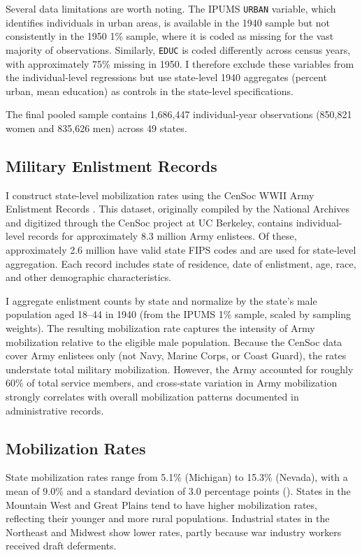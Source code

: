 \documentclass[12pt]{article}
\begin{document}
Several data limitations are worth noting. The IPUMS \texttt{URBAN} variable, which identifies individuals in urban areas, is available in the 1940 sample but not consistently in the 1950 1\% sample, where it is coded as missing for the vast majority of observations. Similarly, \texttt{EDUC} is coded differently across census years, with approximately 75\% missing in 1950. I therefore exclude these variables from the individual-level regressions but use state-level 1940 aggregates (percent urban, mean education) as controls in the state-level specifications.

The final pooled sample contains 1,686,447 individual-year observations (850,821 women and 835,626 men) across 49 states.

\subsection{Military Enlistment Records}

I construct state-level mobilization rates using the CenSoc WWII Army Enlistment Records \citep{cenSoc2024}. This dataset, originally compiled by the National Archives and digitized through the CenSoc project at UC Berkeley, contains individual-level records for approximately 8.3 million Army enlistees. Of these, approximately 2.6 million have valid state FIPS codes and are used for state-level aggregation. Each record includes state of residence, date of enlistment, age, race, and other demographic characteristics.

I aggregate enlistment counts by state and normalize by the state's male population aged 18--44 in 1940 (from the IPUMS 1\% sample, scaled by sampling weights). The resulting mobilization rate captures the intensity of Army mobilization relative to the eligible male population. Because the CenSoc data cover Army enlistees only (not Navy, Marine Corps, or Coast Guard), the rates understate total military mobilization. However, the Army accounted for roughly 60\% of total service members, and cross-state variation in Army mobilization strongly correlates with overall mobilization patterns documented in administrative records.

\subsection{Mobilization Rates}

State mobilization rates range from 5.1\% (Michigan) to 15.3\% (Nevada), with a mean of 9.0\% and a standard deviation of 3.0 percentage points (). States in the Mountain West and Great Plains tend to have higher mobilization rates, reflecting their younger and more rural populations. Industrial states in the Northeast and Midwest show lower rates, partly because war industry workers received draft deferments.
\end{document}
